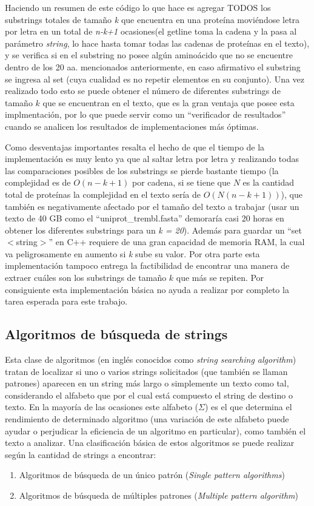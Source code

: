 Haciendo un resumen de este código lo que hace es agregar TODOS los substrings totales de tamaño \textit{k} que encuentra en una proteína moviéndose letra por letra en un total de \textit{n-k+1} ocasiones(el getline toma la cadena y la pasa al parámetro \textit{string}, lo hace hasta tomar todas las cadenas de proteínas en el texto), y se verifica si en el substring no posee algún aminoácido que no se encuentre dentro de los 20 aa. mencionados anteriormente, en caso afirmativo el substring se ingresa al set (cuya cualidad es no repetir elementos en su conjunto). Una vez realizado todo esto se puede obtener el número de diferentes substrings de tamaño $k$ que se encuentran en el texto, que es la gran ventaja que posee esta implmentación, por lo que puede servir como un ``verificador de resultados'' cuando se analicen los resultados de implementaciones más óptimas.

Como desventajas importantes resalta el hecho de que el tiempo de la implementación es muy lento ya que al saltar letra por letra y realizando todas las comparaciones posibles de los substrings se pierde bastante tiempo (la complejidad es de $O(n-k+1)$ por cadena, si se tiene que $N$ es la cantidad total de proteínas la complejidad en el texto sería de $O(N(n-k+1))$), que también es negativamente afectado por el tamaño del texto a trabajar (usar un texto de 40 GB como el ``uniprot\_trembl.fasta'' demoraría casi 20 horas en obtener los diferentes substrings para un \textit{k = 20}). Además para guardar un ``set$<$string$>$'' en C++ requiere de una gran capacidad de memoria RAM, la cual va peligrosamente en aumento si \textit{k} sube su valor. Por otra parte esta implementación tampoco entrega la factibilidad de encontrar una manera de extraer cuáles son los substrings de tamaño $k$ que más se repiten. Por consiguiente esta implementación básica no ayuda a realizar por completo la tarea esperada para este trabajo. 


\subsection{Algoritmos de búsqueda de strings}

Esta clase de algoritmos (en inglés conocidos como \textit{string searching algorithm}) tratan de localizar si uno o varios strings solicitados (que también se llaman patrones) aparecen en un string más largo o simplemente un texto como tal, considerando el alfabeto que por el cual está compuesto el string de destino o texto. En la mayoría de las ocasiones este alfabeto ($\Sigma$) es el que determina el rendimiento de determinado algoritmo (una variación de este alfabeto puede ayudar o perjudicar la eficiencia de un algoritmo en particular), como también el texto a analizar.
Una clasificación básica de estos algoritmos se puede realizar según la cantidad de strings a encontrar:
\begin{enumerate}
\item Algoritmos de búsqueda de un único patrón (\textit{Single pattern algorithms})
\item Algoritmos de búsqueda de múltiples patrones (\textit{Multiple pattern algorithm})
\end{enumerate}

